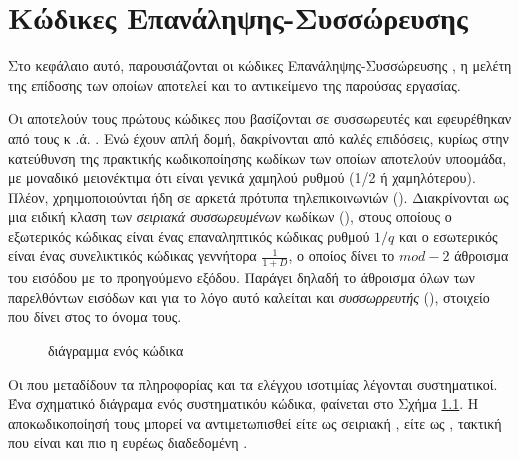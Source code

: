 \chapter{Κώδικες Επανάληψης-Συσσώρευσης }



Στο κεφάλαιο αυτό, παρουσιάζονται οι κώδικες Επανάληψης-Συσσώρευσης , η μελέτη της επίδοσης των οποίων αποτελεί και το αντικείμενο της παρούσας εργασίας.

Οι  αποτελούν τους πρώτους κώδικες που βασίζονται σε συσσωρευτές και εφευρέθηκαν από τους  κ .ά. \cite{divsalar1998coding}. Ενώ έχουν απλή δομή, δακρίνονται από καλές επιδόσεις, κυρίως στην κατεύθυνση της πρακτικής κωδικοποίησης  κωδίκων των οποίων αποτελούν υποομάδα, με μοναδικό μειονέκτιμα ότι είναι γενικά χαμηλού ρυθμού (1/2 ή χαμηλότερου). Πλέον, χρηιμοποιούνται ήδη σε αρκετά πρότυπα τηλεπικοινωνιών (). Διακρίνονται ως μια ειδική κλαση των \textit{σειριακά συσσωρευμένων} κωδίκων (), στους οποίους ο εξωτερικός κώδικας είναι ένας επαναληπτικός κώδικας ρυθμού $1/q$ και ο εσωτερικός είναι ένας συνελικτικός κώδικας γεννήτορα $\frac{1}{1+D}$, ο οποίος δίνει το $mod-2$ άθροισμα του  εισόδου με το προηγούμενο  εξόδου. Παράγει δηλαδή το άθροισμα όλων των παρελθόντων εισόδων και για το λόγο αυτό καλείται και \textit{συσσωρρευτής} (), στοιχείο που δίνει στος  το όνομα τους.

\begin{figure}[h]
\caption{ διάγραμμα ενός  κώδικα}
\label{fig:RA scheme graph}
\end{figure}

Οι  που μεταδίδουν τα  πληροφορίας και τα  ελέγχου ισοτιμίας λέγονται συστηματικοί. Ένα σχηματικό διάγραμα ενός συστηματικόυ  κώδικα, φαίνεται στο Σχήμα \ref{fig:RA scheme graph}. Η αποκωδικοποίησή τους μπορεί να αντιμετωπισθεί είτε ως σειριακή , είτε ως , τακτική που είναι και πιο η ευρέως διαδεδομένη \cite{ryan2009channel}.



